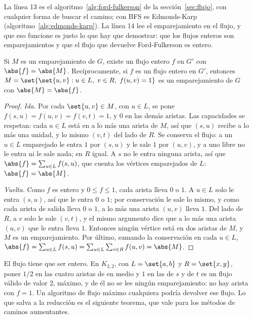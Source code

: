 \documentclass[11pt,letterpaper]{article}
\begin{document}
La línea 13 es el algoritmo~\ref{alg:ford-fulkerson} de la
sección~\ref{sec:flujo}, con cualquier forma de buscar el camino; con
BFS es Edmonds-Karp (algoritmo~\ref{alg:edmonds-karp}). La línea 14
lee el emparejamiento en el flujo, y que eso funcione es justo lo que
hay que demostrar: que los flujos enteros son emparejamientos y que
el flujo que devuelve Ford-Fulkerson es entero.

\begin{lema}
  \label{lem:emparejamiento-flujo}
  Si $M$ es un emparejamiento de $G$, existe un flujo entero $f$ en
  $G'$ con $\abs{f} = \abs{M}$. Recíprocamente, si $f$ es un flujo
  entero en $G'$, entonces
  $M = \set{\set{u, v} : u \in L,\ v \in R,\ f(u, v) = 1}$ es un
  emparejamiento de $G$ con $\abs{M} = \abs{f}$.
\end{lema}

\begin{proof}
  \textit{Ida.} Por cada $\set{u, v} \in M$, con $u \in L$, se pone
  $f(s, u) = f(u, v) = f(v, t) = 1$, y $0$ en las demás aristas. Las
  capacidades se respetan: cada $u \in L$ está en a lo más una arista
  de $M$, así que $(s, u)$ recibe a lo más una unidad, y lo mismo
  $(v, t)$ del lado de $R$. Se conserva el flujo: a un $u \in L$
  emparejado le entra $1$ por $(s, u)$ y le sale $1$ por $(u, v)$, y a
  uno libre no le entra ni le sale nada; en $R$ igual. A $s$ no le
  entra ninguna arista, así que
  $\abs{f} = \sum_{u \in L} f(s, u)$, que cuenta los vértices
  emparejados de $L$: $\abs{f} = \abs{M}$.

  \textit{Vuelta.} Como $f$ es entero y $0 \le f \le 1$, cada arista
  lleva $0$ o $1$. A $u \in L$ solo le entra $(s, u)$, así que le
  entra $0$ o $1$; por conservación le sale lo mismo, y como cada
  arista de salida lleva $0$ o $1$, a lo más una arista $(u, v)$
  lleva $1$. Del lado de $R$, a $v$ solo le sale $(v, t)$, y el mismo
  argumento dice que a lo más una arista $(u, v)$ que le entra lleva
  $1$. Entonces ningún vértice está en dos aristas de $M$, y $M$ es
  un emparejamiento. Por último, sumando la conservación en cada
  $u \in L$,
  $\abs{f} = \sum_{u \in L} f(s, u)
           = \sum_{u \in L} \sum_{v \in R} f(u, v) = \abs{M}$.
\end{proof}

\begin{ojo}
  El flujo tiene que ser entero. En $K_{2,2}$, con $L = \set{a, b}$ y
  $R = \set{x, y}$, poner $1/2$ en las cuatro aristas de en medio y
  $1$ en las de $s$ y de $t$ es un flujo válido de valor $2$, máximo,
  y de él no se lee ningún emparejamiento: no hay arista con
  $f = 1$. Un algoritmo de flujo máximo cualquiera podría devolver
  ese flujo. Lo que salva a la reducción es el siguiente teorema, que
  vale para los métodos de caminos aumentantes.
\end{ojo}
\end{document}
